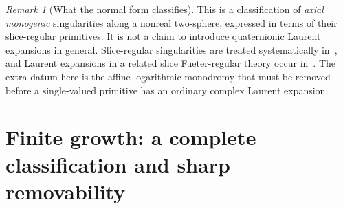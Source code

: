 \documentclass[11pt,a4paper]{article}
\numberwithin{equation}{section}
\theoremstyle{definition}
\theoremstyle{remark}
\newtheorem{remark}[theorem]{Remark}
\begin{document}
\begin{remark}[What the normal form classifies]
This is a classification of \emph{axial monogenic} singularities along a
nonreal two-sphere, expressed in terms of their slice-regular primitives.
It is not a claim to introduce quaternionic Laurent expansions in general.
Slice-regular singularities are treated systematically in~\cite{GPS}, and
Laurent expansions in a related slice Fueter-regular theory occur
in~\cite[\S2.5]{Ghiloni}. The extra datum here is the affine-logarithmic
monodromy that must be removed before a single-valued primitive has an
ordinary complex Laurent expansion.
\end{remark}

\section{Finite growth: a complete classification and sharp removability}
\label{sec:growth}
\end{document}
